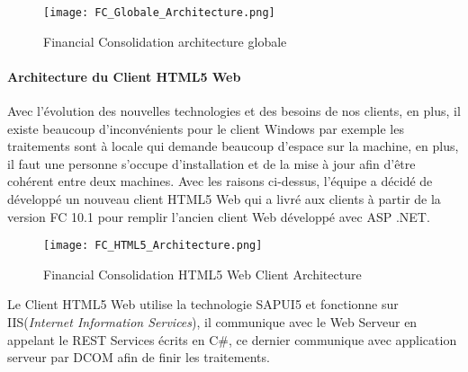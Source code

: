     \begin{figure}[H]
        \centering
        \texttt{[image: FC\_Globale\_Architecture.png]}
        \caption{Financial Consolidation architecture globale}
        \label{fig:FC_architecture_label}
    \end{figure}
    
    \paragraph{Architecture du Client HTML5 Web}
    Avec l'évolution des nouvelles technologies et des besoins de nos clients, en plus, il existe beaucoup d’inconvénients pour le client Windows par exemple les traitements sont à locale qui demande beaucoup d'espace sur la machine, en plus, il faut une personne  s'occupe d'installation et de la mise à jour afin d'être cohérent entre deux machines. Avec les raisons ci-dessus, l'équipe a décidé de développé un nouveau client HTML5 Web qui a livré aux clients à partir de la version FC 10.1 pour remplir l'ancien client Web développé avec ASP .NET.
    
    \begin{figure}[H]
        \centering
        \texttt{[image: FC\_HTML5\_Architecture.png]}
        \caption{Financial Consolidation HTML5 Web Client Architecture}
        \label{fig:FC_HTML5_Architecture_label}
    \end{figure}
    
    \par Le Client HTML5 Web utilise la technologie SAPUI5 et fonctionne sur IIS(\textit{Internet Information Services}), il communique avec le Web Serveur en appelant le REST Services écrits en C\#, ce dernier communique avec application serveur par DCOM afin de finir les traitements.
    
